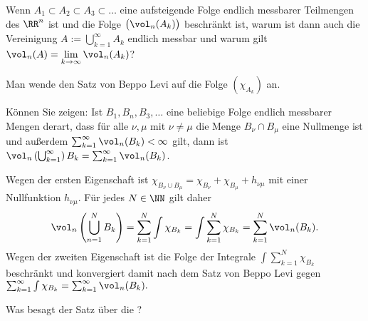 \begin{frage}
  Wenn $A_1 \subset A_2 \subset A_3\subset \ldots$ eine aufsteigende 
  Folge endlich messbarer Teilmengen des $\RR^n$ ist und die Folge 
  $\big(\vol_n(A_k)\big)$ beschränkt ist, warum ist dann auch die 
  Vereinigung $A:=\bigcup_{k=1}^\infty A_k$ endlich messbar und warum gilt 
  $\vol_n(A)=\lim\limits_{k\to\infty} \vol_n(A_k)$? 
\end{frage}

\begin{antwort} 
  Man wende den Satz von Beppo Levi auf die Folge 
  $(\chi_{A_k})$ an. \AntEnd
\end{antwort} 

\begin{frage}
  Können Sie zeigen: 
  Ist $B_1, B_n, B_3, \ldots$ eine beliebige Folge endlich messbarer 
  Mengen derart, dass für alle $\nu,\mu$ mit 
  $\nu\not=\mu$ die Menge $B_\nu\cap B_\mu$ 
  eine Nullmenge ist und außerdem 
  $\sum_{k=1}^\infty \vol_n(B_k) < \infty$ gilt, 
  dann ist $ \vol_n \left( \bigcup_{k=1}^\infty \right) B_k = 
  \sum_{k=1}^\infty \vol_n(B_k)$.
\end{frage}

\begin{antwort}
  Wegen der ersten Eigenschaft ist 
  $\chi_{B_\nu \cup B_\mu}=\chi_{B_\nu} + \chi_{B_\mu} + h_{\nu\mu}$ mit einer 
  Nullfunktion $h_{\nu\mu}$. Für jedes $N\in \NN$ gilt daher  
  \[
  \vol_n \left( \bigcup_{n=1}^N B_k \right)= 
  \sum_{k=1}^N \int  \chi_{B_k} = \int \sum_{k=1}^N \chi_{B_k} =
  \sum_{k=1}^N \vol_n ( B_k ).
  \]
  Wegen der zweiten Eigenschaft ist die Folge der Integrale 
  $\int \sum_{k=1}^N \chi_{B_k}$ beschränkt und 
  konvergiert damit nach dem Satz von Beppo Levi gegen  
  $\sum_{k=1}^\infty\int \chi_{B_k} = 
  \sum_{k=1}^\infty \vol_n(B_k).$\AntEnd
\end{antwort} 

\begin{frage}
  Was besagt der Satz über die ?
\end{frage}

